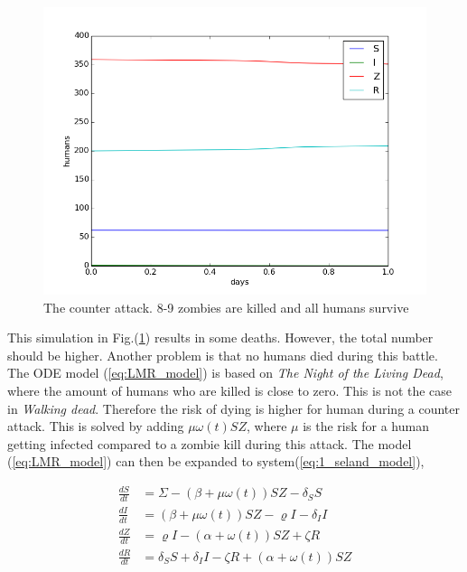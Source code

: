 \documentclass[%
twoside,                 %
final,                   %
chapterprefix=true,      %
open=right               %
10pt]{book}
\begin{document}
\begin{figure}[ht]
  \centerline{\includegraphics[width=0.9\linewidth]{1_fig/WD_zombie_counter_1.png}}
  \caption{
  \label{fig:zombie_counter_1} The counter attack. 8-9 zombies are killed and all humans survive
  }
\end{figure}


This simulation in Fig.(\ref{fig:zombie_counter_1}) results in some deaths. However, the total number should be higher. Another problem is that no humans died during this battle. The ODE model (\ref{eq:LMR_model}) is based on \emph{The Night of the Living Dead}, where the amount of humans who are killed is close to zero. This is not the case in \emph{Walking dead}. Therefore the risk of dying is higher for human during a counter attack. This is solved by adding $\mu \omega (t) SZ$, where $\mu$ is the risk for a human getting infected compared to a zombie kill during this attack. The model (\ref{eq:LMR_model}) can then be expanded to system(\ref{eq:1_seland_model}),

\begin{equation} \label{eq:1_seland_model}
	\begin{aligned} 
	\frac{dS}{dt} &= \Sigma -(\beta+\mu \omega(t))SZ - \delta_SS \\
	\frac{dI}{dt} &= (\beta+\mu \omega(t))SZ - \varrho I - \delta_II\\
	\frac{dZ}{dt} &= \varrho I- (\alpha+\omega(t))SZ + \zeta R\\
	\frac{dR}{dt} &= \delta_SS +\delta_II -\zeta R + (\alpha+\omega(t))SZ 
	\end{aligned}
\end{equation}
\end{document}
